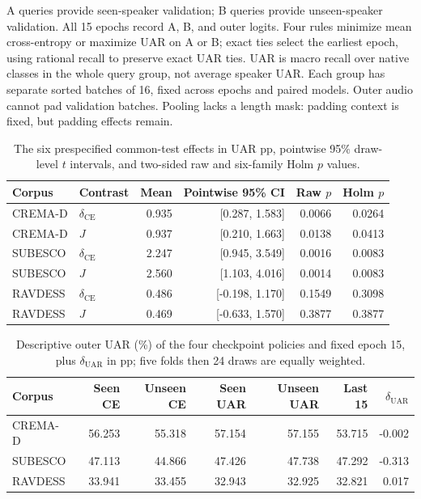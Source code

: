 \documentclass[letterpaper]{article}
\begin{document}
A queries provide seen-speaker validation; B queries provide unseen-speaker
validation. All 15 epochs record A, B, and outer logits. Four rules minimize
mean cross-entropy or maximize UAR on A or B; exact ties select the earliest
epoch, using rational recall to preserve exact UAR ties.
UAR is macro recall over native classes in the whole query group,
not average speaker UAR. Each group has separate sorted batches of 16,
fixed across epochs and paired models. Outer audio cannot pad validation
batches. Pooling lacks a length mask: padding context is fixed, but padding
effects remain.

\begin{table}[t]
\centering\small
\caption{The six prespecified common-test effects in UAR pp, pointwise 95\% draw-level $t$ intervals, and two-sided raw and six-family Holm $p$ values.}
\label{tab:primary}
\setlength{\tabcolsep}{5pt}
\begin{tabular}{llrrrr}\toprule
Corpus & Contrast & Mean & Pointwise 95\% CI & Raw $p$ & Holm $p$\\\midrule
CREMA-D & $\delta_{\mathrm{CE}}$ & 0.935 & [0.287, 1.583] & 0.0066 & 0.0264\\
CREMA-D & $J$ & 0.937 & [0.210, 1.663] & 0.0138 & 0.0413\\
SUBESCO & $\delta_{\mathrm{CE}}$ & 2.247 & [0.945, 3.549] & 0.0016 & 0.0083\\
SUBESCO & $J$ & 2.560 & [1.103, 4.016] & 0.0014 & 0.0083\\
RAVDESS & $\delta_{\mathrm{CE}}$ & 0.486 & [-0.198, 1.170] & 0.1549 & 0.3098\\
RAVDESS & $J$ & 0.469 & [-0.633, 1.570] & 0.3877 & 0.3877\\\bottomrule
\end{tabular}
\end{table}

\begin{table}[t]
\centering\small
\caption{Descriptive outer UAR (\%) of the four checkpoint policies and fixed epoch 15, plus $\delta_{\mathrm{UAR}}$ in pp; five folds then 24 draws are equally weighted.}
\label{tab:absolute}
\setlength{\tabcolsep}{5pt}
\begin{tabular}{lrrrrrr}\toprule
Corpus & Seen CE & Unseen CE & Seen UAR & Unseen UAR & Last 15 & $\delta_{\mathrm{UAR}}$\\\midrule
CREMA-D & 56.253 & 55.318 & 57.154 & 57.155 & 53.715 & -0.002\\
SUBESCO & 47.113 & 44.866 & 47.426 & 47.738 & 47.292 & -0.313\\
RAVDESS & 33.941 & 33.455 & 32.943 & 32.925 & 32.821 & 0.017\\\bottomrule
\end{tabular}
\end{table}
\end{document}
